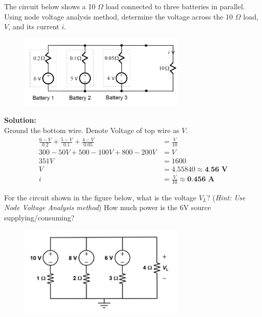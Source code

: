 \documentclass[a4paper, 12pt, addpoints]{exam}
\begin{document}
\begin{questions}
\question The circuit below shows a 10 $\Omega$ load connected to three batteries in parallel. Using node voltage analysis method, determine the voltage across the 10 $\Omega$ load, $V$, and its current $i$.
\begin{figure}[h!]
    \centering
    \includegraphics[width=0.7\textwidth]{images/Q10.png}
\end{figure}

\begin{tcolorbox}
    \textbf{Solution:} \\
    Ground the bottom wire. Denote Voltage of top wire as $V$.
    \begin{align*}
        \frac{6-V}{0.2} + \frac{5-V}{0.1} + \frac{4-V}{0.05} &= \frac{V}{10} \\
        300 - 50V + 500 - 100V + 800 - 200V &= V \\
        351 V &= 1600 \\
        V &= 4.55840 \approx \textbf{4.56 V} \\
        i &= \frac{V}{10} \approx \textbf{0.456 A}
    \end{align*}
\end{tcolorbox}

\question For the circuit shown in the figure below, what is the voltage $V_L$? (\textit{Hint: Use Node Voltage Analysis method}) How much power is the 6V source supplying/consuming?
\begin{figure}[h!]
    \centering
    \includegraphics[width=0.7\textwidth]{images/Q11.png}
\end{figure}


\end{questions}
\end{document}
